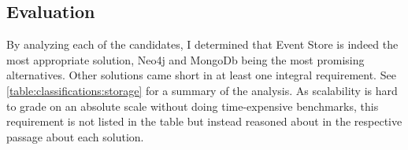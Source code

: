 \subsection{Evaluation}

By analyzing each of the candidates, I determined that Event Store is indeed the most appropriate solution, Neo4j and MongoDb being the most promising alternatives.
Other solutions came short in at least one integral requirement.
See \cref{table:classifications:storage} for a summary of the analysis.
As scalability is hard to grade on an absolute scale without doing time-expensive benchmarks, this requirement is not listed in the table but instead reasoned about in the respective passage about each solution.

\begin{table}[b]
\centering
\caption{Classification of storage solutions; the requirements regarding basic storage capabilities and modifying data are not listed because all solutions satisfy these.}
\label{table:classifications:storage}
\end{table}

